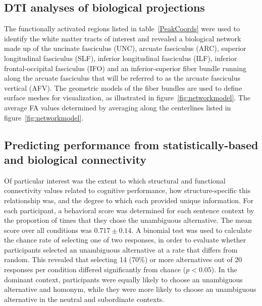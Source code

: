 \documentclass[final,authoryear,5p,times,twocolumn]{elsarticle}
\begin{document}
\subsection{DTI analyses of biological projections}
The functionally activated regions listed in table~\ref{PeakCoords} were used to identify the white matter tracts of interest and revealed a biological network made up of the uncinate fasciculus (UNC), arcuate fasciculus (ARC), superior longitudinal fasciculus (SLF), inferior longitudinal fasciculus (ILF), inferior frontal-occipital fasciculus (IFO) and an inferior-superior fiber bundle running along the arcuate fasciculus that will be referred to as the arcuate fasciculus vertical (AFV). The geometric models of the fiber bundles are used to define surface meshes for visualization, as illustrated in figure~\ref{fig:networkmodel}. The average FA values determined by averaging along the centerlines listed in figure~\ref{fig:networkmodel}. 

\subsection{Predicting performance from statistically-based and biological connectivity}
Of particular interest was the extent to which structural and functional connectivity values related to cognitive performance, how structure-specific this relationship was, and the degree to which each provided unique information. For each participant, a behavioral score was determined for each sentence context by the proportion of times that they chose the unambiguous alternative. The mean score over all conditions was $0.717 \pm 0.14$. A binomial test was used to calculate the chance rate of selecting one of two responses, in order to evaluate whether participants selected an unambiguous alternative at a rate that differs from random. This revealed that selecting 14 (70\%) or more alternatives out of 20 responses per condition differed significantly from chance ($p<0.05$). In the dominant context, participants were equally likely to choose an unambiguous alternative and homonym, while they were more likely to choose an unambiguous alternative in the neutral and subordinate contexts. 
\end{document}
